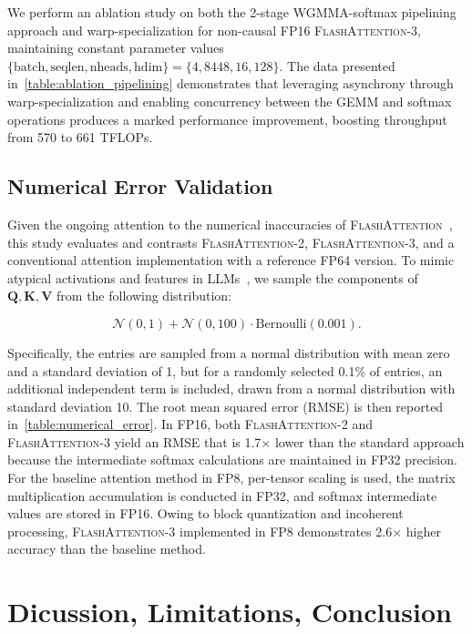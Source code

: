 \begin{enumerate}
We perform an ablation study on both the 2-stage WGMMA-softmax pipelining approach and warp-specialization for non-causal FP16 \textsc{FlashAttention-3}, maintaining constant parameter values $\{\text{batch}, \text{seqlen}, \text{nheads}, \text{hdim}\} = \{ 4, 8448, 16, 128\}$. The data presented in~\cref{table:ablation_pipelining} demonstrates that leveraging asynchrony through warp-specialization and enabling concurrency between the GEMM and softmax operations produces a marked performance improvement, boosting throughput from 570 to 661 TFLOPs.

\subsection{Numerical Error Validation}
\label{sec:numerical_error}

Given the ongoing attention to the numerical inaccuracies of \textsc{FlashAttention}~\citep{golden2024flash}, this study evaluates and contrasts \textsc{FlashAttention-2}, \textsc{FlashAttention-3}, and a conventional attention implementation with a reference FP64 version. To mimic atypical activations and features in LLMs~\citep{dettmers2208llm, sun2024massive}, we sample the components of $\mathbf{Q}, \mathbf{K}, \mathbf{V}$ from the following distribution:

\begin{equation*}
  \mathcal{N}(0, 1) + \mathcal{N}(0, 100) \cdot \mathrm{Bernoulli}(0.001).
\end{equation*}

Specifically, the entries are sampled from a normal distribution with mean zero and a standard deviation of 1, but for a randomly selected 0.1\% of entries, an additional independent term is included, drawn from a normal distribution with standard deviation 10. The root mean squared error (RMSE) is then reported in~\cref{table:numerical_error}. In FP16, both \textsc{FlashAttention-2} and \textsc{FlashAttention-3} yield an RMSE that is 1.7$\times$ lower than the standard approach because the intermediate softmax calculations are maintained in FP32 precision. For the baseline attention method in FP8, per-tensor scaling is used, the matrix multiplication accumulation is conducted in FP32, and softmax intermediate values are stored in FP16. Owing to block quantization and incoherent processing, \textsc{FlashAttention-3} implemented in FP8 demonstrates 2.6$\times$ higher accuracy than the baseline method.

\section{Dicussion, Limitations, Conclusion}
\label{sec:discussion}


\end{enumerate}
